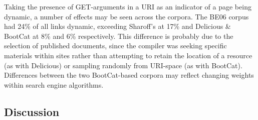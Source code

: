 Taking the presence of GET-arguments in a URI 
as an indicator of a page being dynamic, a number of effects may be seen across the corpora.  The BE06 corpus had 24\% of all links dynamic, exceeding Sharoff's at 17\% and Delicious \& BootCat at 8\% and 6\% respectively.  This difference is probably due to the selection of published documents, since the compiler was seeking specific materials within sites rather than attempting to retain the location of a resource (as with Delicious) or sampling randomly from URI-space (as with BootCat).  Differences between the two BootCat-based corpora may reflect changing weights within search engine algorithms. %












\subsection{Discussion}

